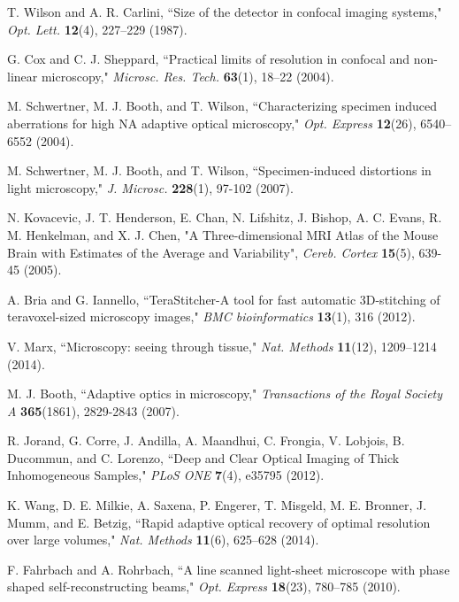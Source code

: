 \documentclass[12pt]{spieman}  %
\begin{document}
\begin{spacing}{2}
\begin{thebibliography}{0}
 T. Wilson and A. R. Carlini, ``Size of the detector in confocal imaging systems," \emph{Opt. Lett.} \textbf{12}(4), 227–229 (1987).

 G. Cox and C. J. Sheppard, ``Practical limits of resolution in confocal and non-linear microscopy," \emph{Microsc. Res. Tech.} \textbf{63}(1), 18–22 (2004).

 M. Schwertner, M. J. Booth, and T. Wilson, ``Characterizing specimen induced aberrations for high NA adaptive optical microscopy," \emph{Opt. Express} \textbf{12}(26), 6540–6552 (2004).

 M. Schwertner, M. J. Booth, and T. Wilson, ``Specimen‐induced distortions in light microscopy," \emph{J. Microsc.} \textbf{228}(1), 97-102 (2007).



 N. Kovacevic, J. T. Henderson, E. Chan, N. Lifshitz, J. Bishop, A. C. Evans, R. M. Henkelman, and X. J. Chen, "A Three-dimensional MRI Atlas of the Mouse Brain with Estimates of the Average and Variability", \emph{Cereb. Cortex} \textbf{15}(5), 639-45 (2005).

 A. Bria and G. Iannello,  ``TeraStitcher-A tool for fast automatic 3D-stitching of teravoxel-sized microscopy images,"  \emph{BMC bioinformatics} \textbf{13}(1), 316 (2012).

 V. Marx, ``Microscopy: seeing through tissue," \emph{Nat. Methods} \textbf{11}(12), 1209–1214 (2014).

 M. J. Booth, ``Adaptive optics in microscopy," \emph{Transactions of the Royal Society A} \textbf{365}(1861), 2829-2843 (2007).

 R. Jorand, G. Corre, J. Andilla, A. Maandhui, C. Frongia, V. Lobjois, B. Ducommun, and C. Lorenzo, ``Deep and Clear Optical Imaging of Thick Inhomogeneous Samples," \emph{PLoS ONE} \textbf{7}(4), e35795 (2012).

 K. Wang, D. E. Milkie, A. Saxena, P. Engerer, T. Misgeld, M. E. Bronner, J. Mumm, and E. Betzig, ``Rapid adaptive optical recovery of optimal resolution over large volumes," \emph{Nat. Methods} \textbf{11}(6), 625–628 (2014).

 F. Fahrbach and A. Rohrbach, ``A line scanned light-sheet microscope with phase shaped self-reconstructing beams," \emph{Opt. Express} \textbf{18}(23), 780–785 (2010).


\end{thebibliography}
\end{spacing}
\end{document}
